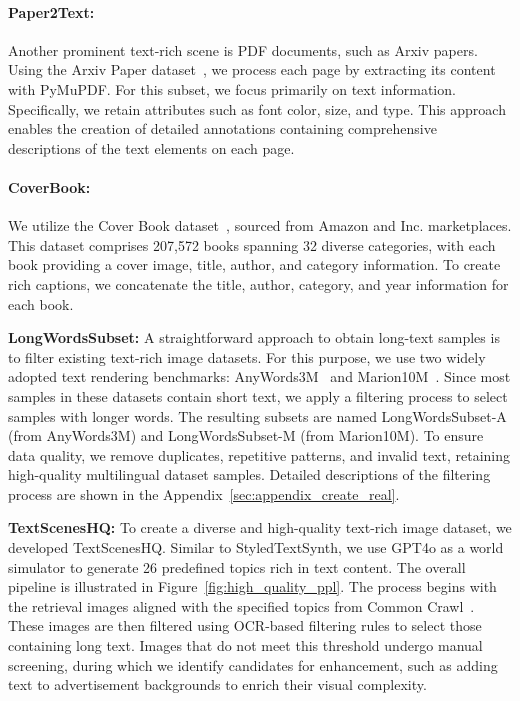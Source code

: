 \paragraph{Paper2Text:}
Another prominent text-rich scene is PDF documents, such as Arxiv papers. 
Using the Arxiv Paper dataset~\cite{arxiv_org_submitters_2024}, we process each page by extracting its content with PyMuPDF. 
For this subset, we focus primarily on text information. 
Specifically, we retain attributes such as font color, size, and type. 
This approach enables the creation of detailed annotations containing comprehensive descriptions of the text elements on each page.





\paragraph{CoverBook:}
We utilize the Cover Book dataset~\cite{coverbook}, sourced from Amazon and Inc. marketplaces. 
This dataset comprises 207,572 books spanning 32 diverse categories, with each book providing a cover image, title, author, and category information.
To create rich captions, we concatenate the title, author, category, and year information for each book.

\textbf{LongWordsSubset:}
A straightforward approach to obtain long-text samples is to filter existing text-rich image datasets. For this purpose, we use two widely adopted text rendering benchmarks: AnyWords3M~\cite{anytext} and Marion10M~\cite{textdiffuser2}.
Since most samples in these datasets contain short text, we apply a filtering process to select samples with longer words. 
The resulting subsets are named LongWordsSubset-A (from AnyWords3M) and LongWordsSubset-M (from Marion10M).
To ensure data quality, we remove duplicates, repetitive patterns, and invalid text, retaining high-quality multilingual dataset samples.
Detailed descriptions of the filtering process are shown in the Appendix~\ref{sec:appendix_create_real}.

\textbf{TextScenesHQ:}
To create a diverse and high-quality text-rich image dataset, we developed TextScenesHQ. 
Similar to StyledTextSynth, we use GPT4o as a world simulator to generate 26 predefined topics rich in text content. 
The overall pipeline is illustrated in Figure~\ref{fig:high_quality_ppl}.
The process begins with the retrieval images aligned with the specified topics from Common Crawl~\cite{mmc4}. 
These images are then filtered using OCR-based filtering rules to select those containing long text. 
Images that do not meet this threshold undergo manual screening, during which we identify candidates for enhancement, such as adding text to advertisement backgrounds to enrich their visual complexity.

